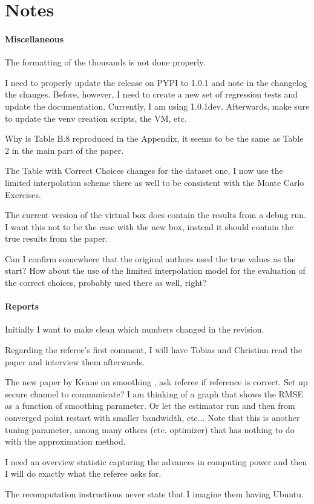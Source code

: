 \section{Notes}


\paragraph{Miscellaneous}

\begin{boenumerate}
\item The formatting of the thousands is not done properly.
\item I need to properly update the release on PYPI to 1.0.1 and note in the changelog the changes. Before, however, I need to create a new set of regression tests and update the documentation. Currently, I am using 1.0.1dev. Afterwards, make sure to update the venv creation scripts, the VM, etc.
\item Why is Table B.8 reproduced in the Appendix, it seems to be the same as Table 2 in the main part of the paper.
\item The Table with Correct Choices changes for the dataset one, I now use the limited interpolation scheme there as well to be consistent with the Monte Carlo Exercises.
\item The current version of the virtual box does contain the results from a debug run. I want this not to be the case with the new box, instead it should contain the true results from the paper.
\item Can I confirm somewhere that the original authors used the true values as the start? How about the use of the limited interpolation model for the evaluation of the correct choices, probably used there as well, right?
\end{boenumerate}

\paragraph{Reports}

\begin{boenumerate}
\item Initially I want to make clean which numbers changed in the revision.
\item Regarding the referee's first comment, I will have Tobias and Christian read the paper and interview them afterwards.
\item The new paper by Keane on smoothing \citep{Bruins.2015}, ask referee if reference is correct. Set up secure channel to communicate? I am thinking of a graph that shows the RMSE as a function of smoothing parameter. Or let the estimator run and then from converged point restart with smaller bandwidth, etc... Note that this is another tuning parameter, among many others (etc. optimizer) that has nothing to do with the approximation method.
\item I need an overview statistic capturing the advances in computing power and then I will do exactly what the referee asks for.
\item The recomputation instructions never state that I imagine them having Ubuntu.
\end{boenumerate}
